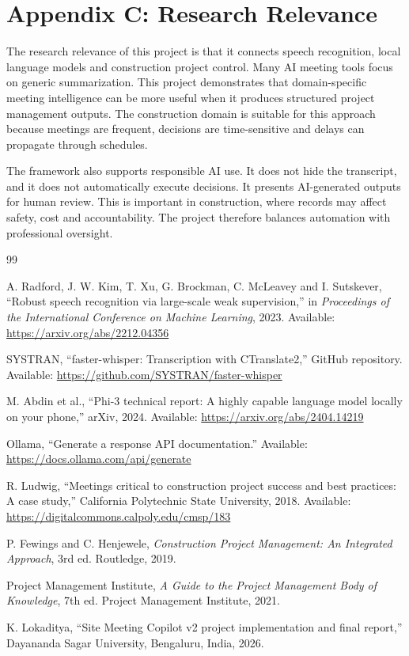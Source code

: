 \documentclass[11pt,a4paper]{article}
\begin{document}
\section*{Appendix C: Research Relevance}

The research relevance of this project is that it connects speech recognition, local language models and construction project control. Many AI meeting tools focus on generic summarization. This project demonstrates that domain-specific meeting intelligence can be more useful when it produces structured project management outputs. The construction domain is suitable for this approach because meetings are frequent, decisions are time-sensitive and delays can propagate through schedules.

The framework also supports responsible AI use. It does not hide the transcript, and it does not automatically execute decisions. It presents AI-generated outputs for human review. This is important in construction, where records may affect safety, cost and accountability. The project therefore balances automation with professional oversight.

\begin{thebibliography}{99}

A. Radford, J. W. Kim, T. Xu, G. Brockman, C. McLeavey and I. Sutskever, ``Robust speech recognition via large-scale weak supervision,'' in \textit{Proceedings of the International Conference on Machine Learning}, 2023. Available: \url{https://arxiv.org/abs/2212.04356}

SYSTRAN, ``faster-whisper: Transcription with CTranslate2,'' GitHub repository. Available: \url{https://github.com/SYSTRAN/faster-whisper}

M. Abdin et al., ``Phi-3 technical report: A highly capable language model locally on your phone,'' arXiv, 2024. Available: \url{https://arxiv.org/abs/2404.14219}

Ollama, ``Generate a response API documentation.'' Available: \url{https://docs.ollama.com/api/generate}

R. Ludwig, ``Meetings critical to construction project success and best practices: A case study,'' California Polytechnic State University, 2018. Available: \url{https://digitalcommons.calpoly.edu/cmsp/183}

P. Fewings and C. Henjewele, \textit{Construction Project Management: An Integrated Approach}, 3rd ed. Routledge, 2019.

Project Management Institute, \textit{A Guide to the Project Management Body of Knowledge}, 7th ed. Project Management Institute, 2021.

K. Lokaditya, ``Site Meeting Copilot v2 project implementation and final report,'' Dayananda Sagar University, Bengaluru, India, 2026.

\end{thebibliography}
\end{document}
